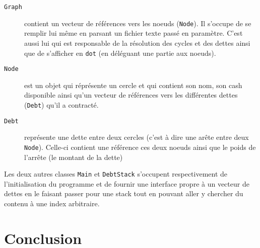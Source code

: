 \documentclass[12pt, oneside]{article}
\begin{document}
\begin{description}
\item[\texttt{Graph}] contient un vecteur de références vers les noeuds (\texttt{Node}). Il s'occupe de se remplir lui même en parsant un fichier texte passé en paramètre. C'est aussi lui qui est responsable de la résolution des cycles et des dettes ainsi que de s'afficher en \texttt{dot} (en déléguant une partie aux noeuds).
\item[\texttt{Node}] est un objet qui réprésente un cercle et qui contient son nom, son cash disponible ainsi qu'un vecteur de références vers les différentes dettes 
(\texttt{Debt}) qu'il a contracté.
\item[\texttt{Debt}] représente une dette entre deux cercles (c'est à dire une arête entre deux \texttt{Node}). Celle-ci contient une référence ces deux noeuds ainsi que le poids de l'arrête (le montant de la dette)
\end{description}
Les deux autres classes \texttt{Main} et \texttt{DebtStack} s'occupent respectivement de l'initialisation du programme et de fournir une interface propre à un vecteur de dettes en le faisant passer pour une stack tout en pouvant aller y chercher du contenu à une index arbitraire.

\section{Conclusion}
\end{document}
